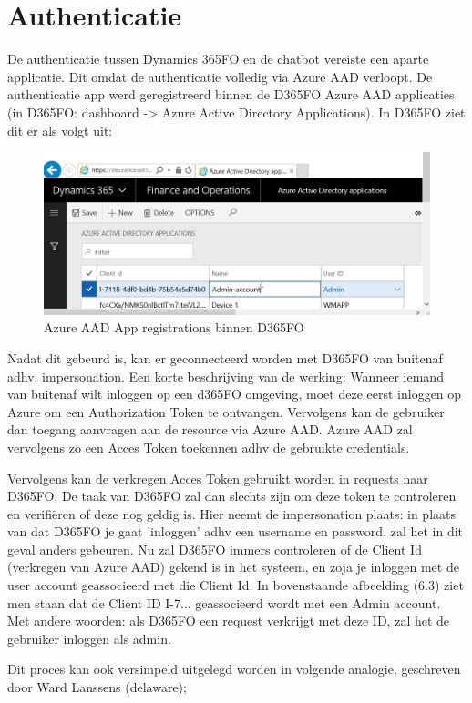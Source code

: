 \section{Authenticatie}
De authenticatie tussen Dynamics 365FO en de chatbot vereiste een aparte applicatie. Dit omdat de authenticatie volledig via Azure AAD verloopt. De authenticatie app werd geregistreerd binnen de D365FO Azure AAD applicaties (in D365FO: dashboard -> Azure Active Directory Applications). In D365FO ziet dit er als volgt uit: 
\begin{figure}[H]
    \centering
    \includegraphics[width=1\textwidth]{img/impersination.png}
    \caption{Azure AAD App registrations binnen D365FO}
\end{figure}
Nadat dit gebeurd is, kan er geconnecteerd worden met D365FO van buitenaf adhv. impersonation. Een korte beschrijving van de werking: 
Wanneer iemand van buitenaf wilt inloggen op een d365FO omgeving, moet deze eerst inloggen op Azure om een Authorization Token te ontvangen. Vervolgens kan de gebruiker dan toegang aanvragen aan de resource via Azure AAD. Azure AAD zal vervolgens zo een Acces Token toekennen adhv de gebruikte credentials. 

Vervolgens kan de verkregen Acces Token gebruikt worden in requests naar D365FO. De taak van D365FO zal dan slechts zijn om deze token te controleren en verifiëren of deze nog geldig is. Hier neemt de impersonation plaats: in plaats van dat D365FO je gaat 'inloggen' adhv een username en password, zal het in dit geval anders gebeuren. Nu zal D365FO immers controleren of de Client Id (verkregen van Azure AAD) gekend is in het systeem, en zoja je inloggen met de user account geassocieerd met die Client Id. In bovenstaande afbeelding (6.3) ziet men staan dat de Client ID I-7... geassocieerd wordt met een Admin account. Met andere woorden: als D365FO een request verkrijgt met deze ID, zal het de gebruiker inloggen als admin. 


Dit proces kan ook versimpeld uitgelegd worden in volgende analogie, geschreven door Ward Lanssens (delaware); 


